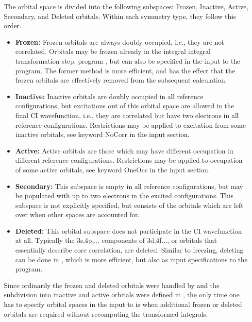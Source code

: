 The orbital space is divided into the following subspaces: Frozen,
Inactive, Active, Secondary, and Deleted orbitals. Within each
symmetry type, they follow this order.
\begin{itemize}
\itemsep 9pt plus 3pt minus 3pt
\item
{\bf Frozen:}
Frozen orbitals are always doubly
occupied, i.e., they are not correlated. Orbitals may be frozen
already in the integral integral transformation step, program
, but can also be specified in the input to the
 program. The former method is more efficient,
and has the effect that the frozen orbitals are effectively removed
from the subsequent
 calculation.
\item
{\bf Inactive:}
Inactive orbitals are doubly occupied
in all reference configurations, but excitations out of this orbital
space are allowed in the final CI wavefunction, i.e., they are
correlated but have two electrons in all reference configurations.
Restrictions may be applied to excitation from some inactive orbitals,
see keyword NoCorr in the  input section.
\item
{\bf Active:}
Active orbitals are those which may have
different occupation in different reference configurations.
Restrictions may be applied to occupation of some active orbitals,
see keyword OneOcc in the  input section.
\item
{\bf Secondary:}
This subspace is empty in all
reference configurations, but may be populated with up to two
electrons in the excited configurations. This subspace is not
explicitly specified, but consists of the orbitals which are left over
when other spaces are accounted for.
\item
{\bf Deleted:}
This orbital subspace does not
participate in the CI wavefunction at all. Typically the 3s,4p,$\ldots$
components of 3d,4f$\ldots$, or orbitals that essentially describe core
correlation, are deleted. Similar to freezing, deleting can be done in
,
which is more efficient, but also as input
specifications to the
 program.
\end{itemize}

Since ordinarily the frozen and deleted orbitals were handled by
and the subdivision into inactive and
active orbitals were defined in
, the only
time one has to specify orbital spaces in the input to
is when additional frozen or deleted orbitals are required without
recomputing the transformed integrals.

